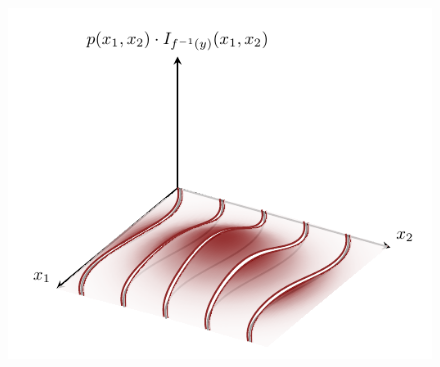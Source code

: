 \documentclass[
  letterpaper,
  DIV=11,
  numbers=noendperiod]{scrartcl}
\begin{document}
\begin{figure}
\begin{minipage}{0.45\linewidth}
{\captionsetup{labelsep=none}\includegraphics{figures/conditional_density_functions/discrete_partition/partitioned_densities/partitioned_densities.pdf}

}

\subcaption{\label{fig-discrete-conditional-partitioned}}

\end{minipage}%
%
\begin{minipage}{0.05\linewidth}
~\end{minipage}%
\newline
\begin{minipage}{0.28\linewidth}
~\end{minipage}%
%
\begin{minipage}{0.45\linewidth}

\end{minipage}
\end{figure}
\end{document}
